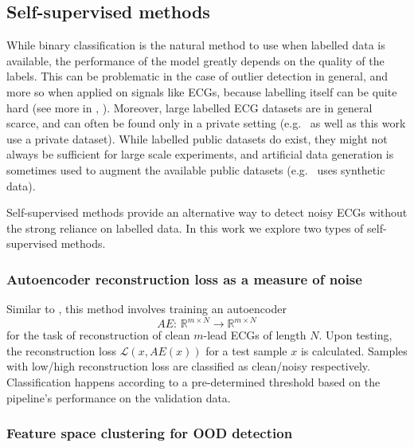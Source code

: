 \documentclass[a4paper,10pt]{article}
\newcommand{\R}{\mathbb{R}}
\newcommand{\Loss}{\mathcal{L}}
\newcommand{\refsec}[1]{\Cref{#1}, \emph{\nameref{#1}}}
\begin{document}
\subsection{Self-supervised methods}

While binary classification is the natural method to use when labelled data is available, the performance of the model greatly depends on the quality of the labels. This can be problematic in the case of outlier detection in general, and more so when applied on signals like ECGs, because labelling itself can be quite hard (see more in \refsec{sec:limitations}). Moreover, large labelled ECG datasets are in general scarce, and can often be found only in a private setting (e.g.\ \cite{binary} as well as this work use a private dataset). While labelled public datasets do exist, they might not always be sufficient for large scale experiments, and artificial data generation is sometimes used to augment the available public datasets (e.g.\ \cite{featurespace} uses synthetic data).

Self-supervised methods provide an alternative way to detect noisy ECGs without the strong reliance on labelled data. In this work we explore two types of self-supervised methods.


\subsubsection{Autoencoder reconstruction loss as a measure of noise}
\label{sec:ae_method}

Similar to \cite{autan}, this method involves training an autoencoder
\[
	AE:\, \R^{m\times N} \to \R^{m\times N}
\]
for the task of reconstruction of clean $m$-lead ECGs of length $N$. Upon testing, the reconstruction loss $\Loss(x, AE(x))$ for a test sample $x$ is calculated. Samples with low/high reconstruction loss are classified as clean/noisy respectively. Classification happens according to a pre-determined threshold based on the pipeline's performance on the validation data.


\subsubsection{Feature space clustering for OOD detection}
\label{sec:fs_method}
\end{document}
